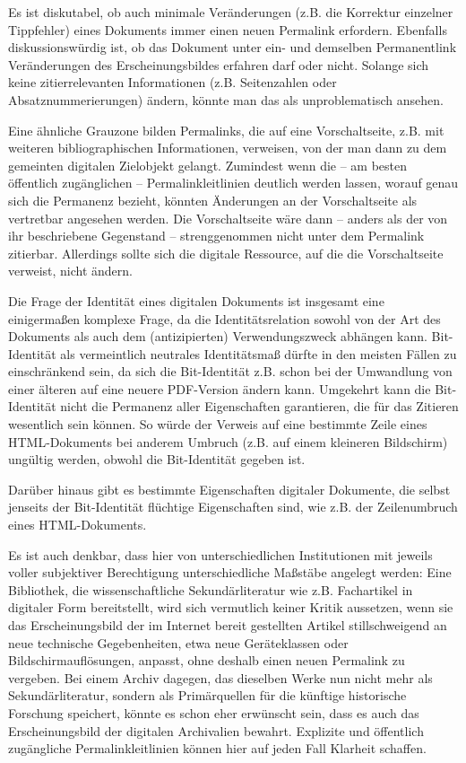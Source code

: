 \documentclass[12pt, a4paper]{article}
\begin{document}
Es ist diskutabel, ob auch minimale Veränderungen (z.B. die Korrektur
einzelner Tippfehler) eines Dokuments immer einen neuen Permalink
erfordern. Ebenfalls diskussionswürdig ist, ob das Dokument unter ein-
und demselben Permanentlink Veränderungen des Erscheinungsbildes
erfahren darf oder nicht. Solange sich keine zitierrelevanten
Informationen (z.B. Seitenzahlen oder Absatznummerierungen) ändern,
könnte man das als unproblematisch ansehen.

Eine ähnliche Grauzone bilden Permalinks, die auf eine Vorschaltseite,
z.B. mit weiteren bibliographischen Informationen, verweisen, von der
man dann zu dem gemeinten digitalen Zielobjekt gelangt. Zumindest wenn
die -- am besten öffentlich zugänglichen -- Permalinkleitlinien
deutlich werden lassen, worauf genau sich die Permanenz bezieht,
könnten Änderungen an der Vorschaltseite als vertretbar angesehen
werden. Die Vorschaltseite wäre dann -- anders als der von ihr
beschriebene Gegenstand -- strenggenommen nicht unter dem Permalink
zitierbar.  Allerdings sollte sich die digitale Ressource, auf die die
Vorschaltseite verweist, nicht ändern.

Die Frage der Identität eines digitalen Dokuments ist insgesamt eine
einigermaßen komplexe Frage, da die Identitätsrelation sowohl von der
Art des Dokuments als auch dem (antizipierten) Verwendungszweck
abhängen kann. Bit-Identität als vermeintlich neutrales Identitätsmaß
dürfte in den meisten Fällen zu einschränkend sein, da sich die
Bit-Identität z.B. schon bei der Umwandlung von einer älteren auf
eine neuere PDF-Version ändern kann. Umgekehrt kann die Bit-Identität
nicht die Permanenz aller Eigenschaften garantieren, die für das
Zitieren wesentlich sein können. So würde der Verweis auf eine
bestimmte Zeile eines HTML-Dokuments bei anderem Umbruch (z.B. auf
einem kleineren Bildschirm) ungültig werden, obwohl die Bit-Identität
gegeben ist.

Darüber hinaus gibt es bestimmte
Eigenschaften digitaler Dokumente, die selbst jenseits der
Bit-Identität flüchtige Eigenschaften sind, wie z.B. der Zeilenumbruch
eines HTML-Dokuments.

Es ist auch denkbar, dass hier von unterschiedlichen Institutionen mit
jeweils voller subjektiver Berechtigung unterschiedliche Maßstäbe
angelegt werden: Eine Bibliothek, die wissenschaftliche
Sekundärliteratur wie z.B. Fachartikel in digitaler Form bereitstellt,
wird sich vermutlich keiner Kritik aussetzen, wenn sie das
Erscheinungsbild der im Internet bereit gestellten Artikel
stillschweigend an neue technische Gegebenheiten, etwa neue
Geräteklassen oder Bildschirmauflösungen, anpasst, ohne deshalb einen
neuen Permalink zu vergeben. Bei einem Archiv dagegen, das dieselben
Werke nun nicht mehr als Sekundärliteratur, sondern als Primärquellen
für die künftige historische Forschung speichert, könnte es schon eher
erwünscht sein, dass es auch das Erscheinungsbild der digitalen
Archivalien bewahrt. Explizite und öffentlich zugängliche
Permalinkleitlinien können hier auf jeden Fall Klarheit schaffen.
\end{document}
